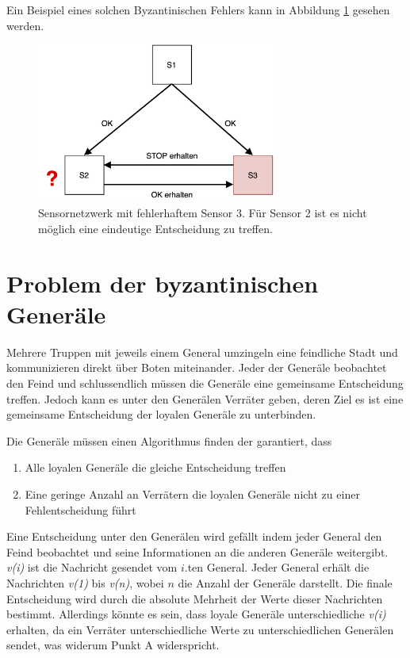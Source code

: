 \documentclass{article}
\begin{document}
\medskip 

Ein Beispiel eines solchen Byzantinischen Fehlers kann in Abbildung \ref{fig:example} gesehen werden. 

\begin{figure}[h]
    \centering
    \includegraphics[width=0.7\textwidth]{byz-sensor-example.png}
    \caption{Sensornetzwerk mit fehlerhaftem Sensor 3. Für Sensor 2 ist es nicht möglich eine eindeutige Entscheidung zu treffen.}
    \label{fig:example}
\end{figure}

\medskip 

\fi

\section{Problem der byzantinischen Generäle}
\label{sec:generals}

Mehrere Truppen mit jeweils einem General umzingeln eine feindliche Stadt und 
kommunizieren direkt über Boten miteinander. 
Jeder der Generäle beobachtet den Feind und schlussendlich müssen die Generäle 
eine gemeinsame Entscheidung treffen. Jedoch kann es unter den Generälen Verräter geben,
deren Ziel es ist eine gemeinsame Entscheidung der loyalen Generäle zu unterbinden. 

\medskip 

Die Generäle müssen einen Algorithmus finden der garantiert, dass

\begin{enumerate}[label=(\alph*)]
\item Alle loyalen Generäle die gleiche Entscheidung treffen 
\item Eine geringe Anzahl an Verrätern die loyalen Generäle nicht zu einer Fehlentscheidung führt
\end{enumerate}

Eine Entscheidung unter den Generälen wird gefällt 
indem jeder General den Feind beobachtet und seine
Informationen an die anderen Generäle weitergibt. \textit{v(i)} ist die 
Nachricht gesendet vom $i$.ten General. Jeder General erhält die Nachrichten 
\textit{v(1)} bis \textit{v(n)}, wobei $n$ die Anzahl der Generäle darstellt. 
Die finale Entscheidung wird durch die absolute Mehrheit der Werte dieser Nachrichten
bestimmt. Allerdings könnte es sein, dass loyale Generäle unterschiedliche \textit{v(i)}
erhalten, da ein Verräter unterschiedliche Werte zu unterschiedlichen Generälen sendet, 
was widerum Punkt A widerspricht. 
\end{document}
